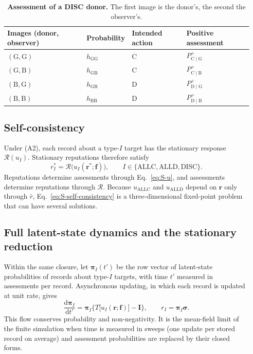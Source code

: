 \documentclass[fleqn,10pt]{article}
\theoremstyle{plain}
\theoremstyle{remark}
\newcommand{\Rm}{\mathcal R}
\newcommand{\G}{\mathrm G}
\newcommand{\B}{\mathrm B}
\newcommand{\C}{\mathrm C}
\newcommand{\D}{\mathrm D}
\newcommand{\ALLC}{\mathrm{ALLC}}
\newcommand{\ALLD}{\mathrm{ALLD}}
\newcommand{\DISC}{\mathrm{DISC}}
\newcommand{\Pp}[2]{P^+_{\mathrm{#1}\mid\mathrm{#2}}}
\begin{document}
\begin{table}[htbp]
\centering\small
\caption{\textbf{Assessment of a DISC donor.} The first image is the donor's, the second the observer's.}
\label{tab:disc-cases}
\begin{tabular}{@{}llll@{}}
\toprule
Images (donor, observer) & Probability & Intended action & Positive assessment\\
\midrule
$(\G,\G)$ & $h_{\G\G}$ & $\C$ & $\Pp CG$\\
$(\G,\B)$ & $h_{\G\B}$ & $\C$ & $\Pp CB$\\
$(\B,\G)$ & $h_{\G\B}$ & $\D$ & $\Pp DG$\\
$(\B,\B)$ & $h_{\B\B}$ & $\D$ & $\Pp DB$\\
\bottomrule
\end{tabular}
\end{table}

\subsection{Self-consistency}
Under (A2), each record about a type-$I$ target has the stationary response
$\Rm(u_I)$. Stationary reputations therefore satisfy
\begin{equation}
r_I^*=\Rm\bigl(u_I(\boldsymbol r^*;\boldsymbol f)\bigr),\qquad
I\in\{\ALLC,\ALLD,\DISC\}.
\label{eq:S-self-consistency}
\end{equation}
Reputations determine assessments through Eq.~\eqref{eq:S-u}, and assessments
determine reputations through $\Rm$. Because $u_{\ALLC}$ and $u_{\ALLD}$ depend on
$\boldsymbol r$ only through $\bar r$, Eq.~\eqref{eq:S-self-consistency} is a
three-dimensional fixed-point problem that can have several solutions.

\subsection{Full latent-state dynamics and the stationary reduction}
Within the same closure, let $\boldsymbol\pi_I(t')$ be the row vector of
latent-state probabilities of records about type-$I$ targets, with time $t'$
measured in assessments per record. Asynchronous updating, in which each record
is updated at unit rate, gives
\begin{equation}
\frac{\mathrm d\boldsymbol\pi_I}{\mathrm dt'}
=\boldsymbol\pi_I\bigl\{T\bigl[u_I(\boldsymbol r;\boldsymbol f)\bigr]-\mathbf I\bigr\},
\qquad r_I=\boldsymbol\pi_I\boldsymbol\sigma .
\label{eq:S-full-state}
\end{equation}
This flow conserves probability and non-negativity. It is the mean-field limit
of the finite simulation when time is measured in sweeps (one update per stored
record on average) and assessment probabilities are replaced by their closed
forms.
\end{document}
